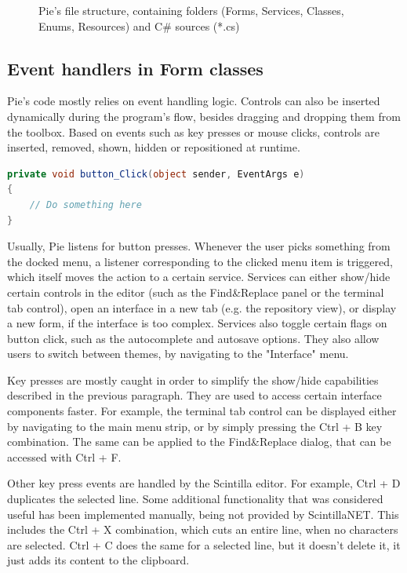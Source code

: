 \begin{figure}
\centering
{}
\caption{Pie's file structure, containing folders (Forms, Services, Classes, Enums, Resources) and C\# sources (*.cs)}
\end{figure}

\subsection{Event handlers in Form classes}

Pie's code mostly relies on event handling logic. Controls can also be inserted dynamically during the program's flow, besides dragging and dropping them from the toolbox. Based on events such as key presses or mouse clicks, controls are inserted, removed, shown, hidden or repositioned at runtime.

\begin{lstlisting}[language=csharp, caption={Example of a C\# event handler}]
private void button_Click(object sender, EventArgs e)
{
    // Do something here
}
\end{lstlisting}

Usually, Pie listens for button presses. Whenever the user picks something from the docked menu, a listener corresponding to the clicked menu item is triggered, which itself moves the action to a certain service. Services can either show/hide certain controls in the editor (such as the Find\&Replace panel or the terminal tab control), open an interface in a new tab (e.g. the repository view), or display a new form, if the interface is too complex. Services also toggle certain flags on button click, such as the autocomplete and autosave options. They also allow users to switch between themes, by navigating to the "Interface" menu.

Key presses are mostly caught in order to simplify the show/hide capabilities described in the previous paragraph. They are used to access certain interface components faster. For example, the terminal tab control can be displayed either by navigating to the main menu strip, or by simply pressing the Ctrl + B key combination. The same can be applied to the Find\&Replace dialog, that can be accessed with Ctrl + F.

Other key press events are handled by the Scintilla editor. For example, Ctrl + D duplicates the selected line. Some additional functionality that was considered useful has been implemented manually, being not provided by ScintillaNET. This includes the Ctrl + X combination, which cuts an entire line, when no characters are selected. Ctrl + C does the same for a selected line, but it doesn't delete it, it just adds its content to the clipboard.